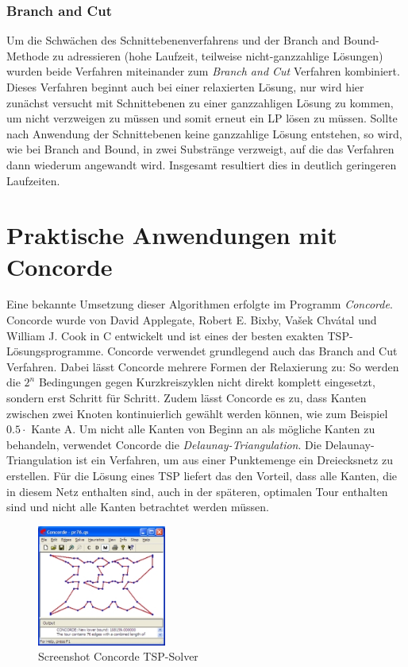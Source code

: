 \documentclass[a4paper, 11pt]{article}
\begin{document}
\subsubsection{Branch and Cut}
Um die Schwächen des Schnittebenenverfahrens und der Branch and Bound-Methode
zu adressieren (hohe Laufzeit, teilweise nicht-ganzzahlige Lösungen) wurden
beide Verfahren miteinander zum \textit{Branch and Cut} Verfahren kombiniert.
Dieses Verfahren beginnt auch bei einer relaxierten Lösung, nur wird hier
zunächst versucht mit Schnittebenen zu einer ganzzahligen Lösung zu kommen,
um nicht verzweigen zu müssen und somit erneut ein LP lösen zu müssen. Sollte
nach Anwendung der Schnittebenen keine ganzzahlige Lösung entstehen, so wird,
wie bei Branch and Bound, in zwei Substränge verzweigt, auf die das Verfahren
dann wiederum angewandt wird.
Insgesamt resultiert dies in deutlich geringeren Laufzeiten.

\section{Praktische Anwendungen mit Concorde}
Eine bekannte Umsetzung dieser Algorithmen erfolgte im Programm \textit{Concorde}.
Concorde wurde von David Applegate, Robert E. Bixby, Vašek Chvátal und William J. Cook
in C entwickelt und ist eines der besten exakten TSP-Lösungsprogramme.
Concorde verwendet grundlegend auch das Branch and Cut Verfahren.
Dabei lässt Concorde mehrere Formen der Relaxierung
zu: So werden die $2^n$ Bedingungen gegen
Kurzkreiszyklen nicht direkt komplett eingesetzt, sondern erst Schritt für Schritt.
Zudem lässt Concorde es zu, dass Kanten zwischen zwei Knoten kontinuierlich gewählt
werden können, wie zum Beispiel $0.5 \cdot$ Kante A. Um nicht alle Kanten von Beginn
an als mögliche Kanten zu behandeln,
verwendet Concorde die \textit{Delaunay-Triangulation}.
Die Delaunay-Triangulation ist ein Verfahren, um aus einer Punktemenge ein Dreiecksnetz
zu erstellen. Für die Lösung eines TSP liefert das den Vorteil, dass alle Kanten, die
in diesem Netz enthalten sind, auch in der späteren, optimalen Tour enthalten sind und
nicht alle Kanten betrachtet werden müssen.

\begin{figure}
  \centering
  \includegraphics[width=\linewidth,height=150px,keepaspectratio]{tsp_concorde.jpg}
  \caption{Screenshot Concorde TSP-Solver}
  \label{img:cutting_planes_2}
\end{figure}
\end{document}
